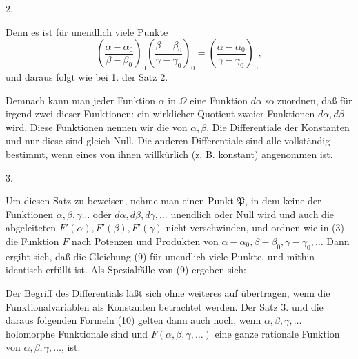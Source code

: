 
2. 

Denn es ist für unendlich viele Punkte
\[
\left(\frac{\alpha-\alpha_0}{\beta-\beta_0}\right)_0 \left(\frac{\beta-\beta_0}{\gamma-\gamma_0}\right)_0 = \left(\frac{\alpha-\alpha_0}{\gamma-\gamma_0}\right)_0,
\]
und daraus folgt wie bei 1. der Satz 2.

Demnach kann man jeder Funktion $\alpha$ in $\Omega$ eine Funktion $d\alpha$ so zuordnen, daß für irgend zwei dieser Funktionen:
ein wirklicher Quotient zweier Funktionen $d\alpha, d\beta$ wird. Diese Funktionen nennen wir die  von $\alpha, \beta$. Die Differentiale der Konstanten und nur diese sind gleich Null. Die anderen Differentiale sind alle vollständig bestimmt, wenn eines von ihnen willkürlich (z. B. konstant) angenommen ist.

3. 

Um diesen Satz zu beweisen, nehme man einen Punkt $\mathfrak{P}$, in dem keine der Funktionen $\alpha, \beta, \gamma \ldots$ oder $d\alpha, d\beta, d\gamma, \ldots$ unendlich oder Null wird und auch die abgeleiteten $F'(\alpha), F'(\beta), F'(\gamma)$ nicht verschwinden, und ordnen wie in (3) die Funktion $F$ nach Potenzen und Produkten von $\alpha - \alpha_0, \beta - \beta_0, \gamma - \gamma_0, \ldots$ Dann ergibt sich, daß die Gleichung (9) für unendlich viele Punkte, und mithin identisch erfüllt ist. Als Spezialfälle von (9) ergeben sich:

Der Begriff des Differentials läßt sich ohne weiteres auf  übertragen, wenn die Funktionalvariablen als Konstanten betrachtet werden. Der Satz 3. und die daraus folgenden Formeln (10) gelten dann auch noch, wenn $\alpha, \beta, \gamma, \ldots$ holomorphe Funktionale sind und $F(\alpha, \beta, \gamma, \ldots)$ eine ganze rationale Funktion von $\alpha, \beta, \gamma, \ldots$, ist.
